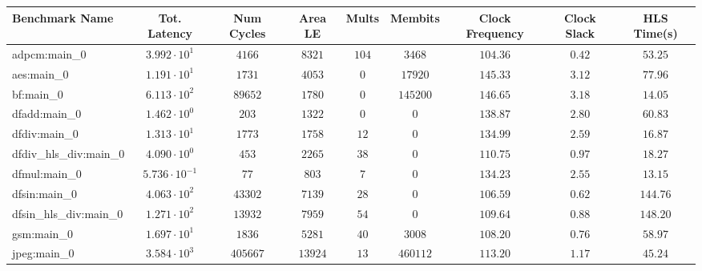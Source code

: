 \begin{tabular}{|l|c|c|c|c|c|c|c|c|}
\hline
Benchmark Name          & Tot. Latency            & Num Cycles & Area LE   & Mults   & Membits    & Clock Frequency & Clock Slack & HLS Time(s) \\
\hline
adpcm:main\_0           & $ 3.992 \cdot 10^{1}  $ & $ 4166   $ & $ 8321  $ & $ 104 $ & $ 3468   $ & $ 104.36      $ & $ 0.42    $ & $ 53.25   $ \\
aes:main\_0             & $ 1.191 \cdot 10^{1}  $ & $ 1731   $ & $ 4053  $ & $ 0   $ & $ 17920  $ & $ 145.33      $ & $ 3.12    $ & $ 77.96   $ \\
bf:main\_0              & $ 6.113 \cdot 10^{2}  $ & $ 89652  $ & $ 1780  $ & $ 0   $ & $ 145200 $ & $ 146.65      $ & $ 3.18    $ & $ 14.05   $ \\
dfadd:main\_0           & $ 1.462 \cdot 10^{0}  $ & $ 203    $ & $ 1322  $ & $ 0   $ & $ 0      $ & $ 138.87      $ & $ 2.80    $ & $ 60.83   $ \\
dfdiv:main\_0           & $ 1.313 \cdot 10^{1}  $ & $ 1773   $ & $ 1758  $ & $ 12  $ & $ 0      $ & $ 134.99      $ & $ 2.59    $ & $ 16.87   $ \\
dfdiv\_hls\_div:main\_0 & $ 4.090 \cdot 10^{0}  $ & $ 453    $ & $ 2265  $ & $ 38  $ & $ 0      $ & $ 110.75      $ & $ 0.97    $ & $ 18.27   $ \\
dfmul:main\_0           & $ 5.736 \cdot 10^{-1} $ & $ 77     $ & $ 803   $ & $ 7   $ & $ 0      $ & $ 134.23      $ & $ 2.55    $ & $ 13.15   $ \\
dfsin:main\_0           & $ 4.063 \cdot 10^{2}  $ & $ 43302  $ & $ 7139  $ & $ 28  $ & $ 0      $ & $ 106.59      $ & $ 0.62    $ & $ 144.76  $ \\
dfsin\_hls\_div:main\_0 & $ 1.271 \cdot 10^{2}  $ & $ 13932  $ & $ 7959  $ & $ 54  $ & $ 0      $ & $ 109.64      $ & $ 0.88    $ & $ 148.20  $ \\
gsm:main\_0             & $ 1.697 \cdot 10^{1}  $ & $ 1836   $ & $ 5281  $ & $ 40  $ & $ 3008   $ & $ 108.20      $ & $ 0.76    $ & $ 58.97   $ \\
jpeg:main\_0            & $ 3.584 \cdot 10^{3}  $ & $ 405667 $ & $ 13924 $ & $ 13  $ & $ 460112 $ & $ 113.20      $ & $ 1.17    $ & $ 45.24   $ \\

\end{tabular}
